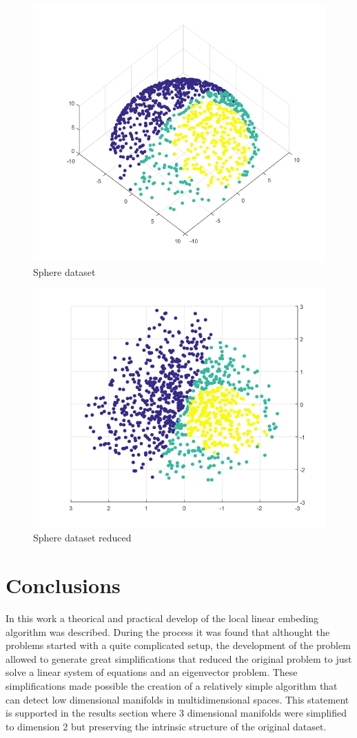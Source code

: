 \documentclass[12pt,journal]{IEEEtran}
\begin{document}
\begin{figure}[H]
    \centering
    \includegraphics[width=0.8\linewidth]{images/sphere.png}
    \caption{Sphere dataset}
    \label{sphere}
\end{figure}

\begin{figure}[H]
    \centering
    \includegraphics[width=0.8\linewidth]{images/sphere_result.png}
    \caption{Sphere dataset reduced}
    \label{sphere_res}
\end{figure}

\section{Conclusions}

In this work a theorical and practical develop of the local linear embeding
algorithm was described. During the process it was found that althought the
problems started with a quite complicated setup, the development of the problem
allowed to generate great simplifications that reduced the original problem to
just solve a linear system of equations and an eigenvector problem. These
simplifications made possible the creation of a relatively simple algorithm that
can detect low dimensional manifolds in multidimensional spaces. This statement
is supported in the results section where 3 dimensional manifolds were
simplified to dimension 2 but preserving the intrinsic structure of the original
dataset.



\end{document}
